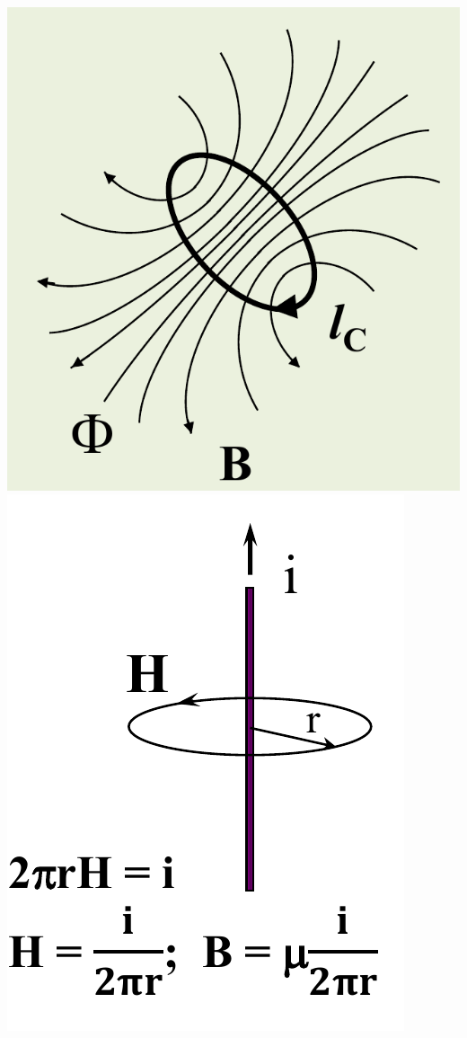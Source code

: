 \documentclass{article}
\begin{document}
\begin{center}
    \includegraphics[scale=0.27]{Image/Legge di Faraday.png}
    \includegraphics[scale=0.27]{Image/Campo magnetico.png}
\end{center}
\end{document}
